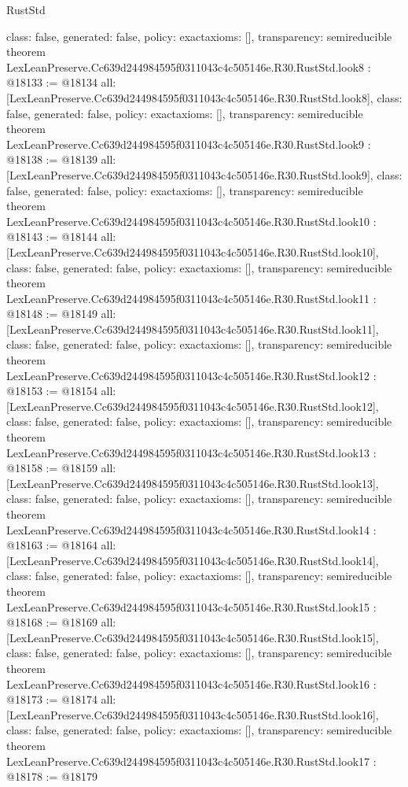 \begin{lexlean}{RustStd}
\begin{coremodule}
{  class: false,
  generated: false,
  policy: exact{axioms: []},
  transparency: semireducible
}
theorem LexLeanPreserve.Cc639d244984595f0311043c4c505146e.R30.RustStd.look8 : @18133 := @18134 {
  all: [LexLeanPreserve.Cc639d244984595f0311043c4c505146e.R30.RustStd.look8],
  class: false,
  generated: false,
  policy: exact{axioms: []},
  transparency: semireducible
}
theorem LexLeanPreserve.Cc639d244984595f0311043c4c505146e.R30.RustStd.look9 : @18138 := @18139 {
  all: [LexLeanPreserve.Cc639d244984595f0311043c4c505146e.R30.RustStd.look9],
  class: false,
  generated: false,
  policy: exact{axioms: []},
  transparency: semireducible
}
theorem LexLeanPreserve.Cc639d244984595f0311043c4c505146e.R30.RustStd.look10 : @18143 := @18144 {
  all: [LexLeanPreserve.Cc639d244984595f0311043c4c505146e.R30.RustStd.look10],
  class: false,
  generated: false,
  policy: exact{axioms: []},
  transparency: semireducible
}
theorem LexLeanPreserve.Cc639d244984595f0311043c4c505146e.R30.RustStd.look11 : @18148 := @18149 {
  all: [LexLeanPreserve.Cc639d244984595f0311043c4c505146e.R30.RustStd.look11],
  class: false,
  generated: false,
  policy: exact{axioms: []},
  transparency: semireducible
}
theorem LexLeanPreserve.Cc639d244984595f0311043c4c505146e.R30.RustStd.look12 : @18153 := @18154 {
  all: [LexLeanPreserve.Cc639d244984595f0311043c4c505146e.R30.RustStd.look12],
  class: false,
  generated: false,
  policy: exact{axioms: []},
  transparency: semireducible
}
theorem LexLeanPreserve.Cc639d244984595f0311043c4c505146e.R30.RustStd.look13 : @18158 := @18159 {
  all: [LexLeanPreserve.Cc639d244984595f0311043c4c505146e.R30.RustStd.look13],
  class: false,
  generated: false,
  policy: exact{axioms: []},
  transparency: semireducible
}
theorem LexLeanPreserve.Cc639d244984595f0311043c4c505146e.R30.RustStd.look14 : @18163 := @18164 {
  all: [LexLeanPreserve.Cc639d244984595f0311043c4c505146e.R30.RustStd.look14],
  class: false,
  generated: false,
  policy: exact{axioms: []},
  transparency: semireducible
}
theorem LexLeanPreserve.Cc639d244984595f0311043c4c505146e.R30.RustStd.look15 : @18168 := @18169 {
  all: [LexLeanPreserve.Cc639d244984595f0311043c4c505146e.R30.RustStd.look15],
  class: false,
  generated: false,
  policy: exact{axioms: []},
  transparency: semireducible
}
theorem LexLeanPreserve.Cc639d244984595f0311043c4c505146e.R30.RustStd.look16 : @18173 := @18174 {
  all: [LexLeanPreserve.Cc639d244984595f0311043c4c505146e.R30.RustStd.look16],
  class: false,
  generated: false,
  policy: exact{axioms: []},
  transparency: semireducible
}
theorem LexLeanPreserve.Cc639d244984595f0311043c4c505146e.R30.RustStd.look17 : @18178 := @18179 {
}
\end{coremodule}
\end{lexlean}
